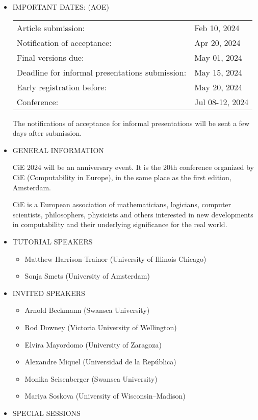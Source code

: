 \documentclass[prodmode,acmtecs]{acmsmall} %
\begin{document}
\begin{itemize}\item  IMPORTANT DATES:  (AOE) 
 
\begin{tabulary}{\linewidth}{LL}Article submission:  & Feb 10, 2024 \\
Notification of acceptance:  & Apr 20, 2024 \\
Final versions due:  & May 01, 2024 \\
Deadline for informal presentations submission:  & May 15, 2024 \\
Early registration before:  & May 20, 2024 \\
Conference:  & Jul 08-12, 2024 \\
\end{tabulary}
 
  The notifications of acceptance for informal presentations will be sent a few days after submission. 
 
\item  GENERAL INFORMATION 
 
  CiE 2024 will be an anniversary event. It is the 20th conference organized by CiE (Computability in Europe), in the same place as the first edition, Amsterdam. 
 
  CiE is a European association of mathematicians, logicians, computer scientists, philosophers, physicists and others interested in new developments in computability and their underlying significance for the real world. 
 
\item  TUTORIAL SPEAKERS 
 
\begin{itemize}\item  Matthew Harrison-Trainor (University of Illinois Chicago)
\item  Sonja Smets (University of Amsterdam)
\end{itemize} 
\item  INVITED SPEAKERS 
 
\begin{itemize}\item  Arnold Beckmann (Swansea University)
\item  Rod Downey (Victoria University of Wellington)
\item  Elvira Mayordomo (University of Zaragoza)
\item  Alexandre Miquel (Universidad de la República)
\item  Monika Seisenberger (Swansea University)
\item  Mariya Soskova (University of Wisconsin–Madison)
\end{itemize} 
\item  SPECIAL SESSIONS 
 

\end{itemize}
\end{document}
